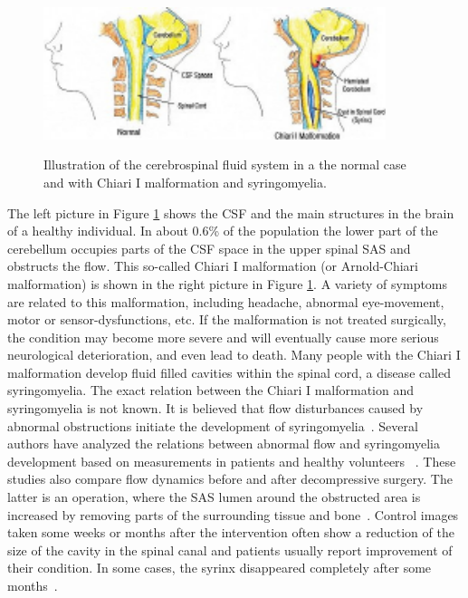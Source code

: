 \begin{figure}\begin{center}
\includegraphics[width=100mm]{chapters/hentschel/pdf/chiara_about.pdf}
\caption{Illustration of the cerebrospinal fluid system in a the normal case and with Chiari I malformation and syringomyelia.}
\label{fig:anatomy}
\end{center}\end{figure}

The left picture in Figure \ref{fig:anatomy} shows the CSF and the
main structures in the brain of a healthy individual. In about 0.6\%
of the population the lower part of the cerebellum occupies parts of
the CSF space in the upper spinal SAS and obstructs the flow. This
so-called Chiari I malformation  (or
Arnold-Chiari malformation) is
shown in the right picture in Figure \ref{fig:anatomy}. A variety of
symptoms are related to this malformation, including headache, abnormal
eye-movement, motor or sensor-dysfunctions, etc. If the malformation
is not treated surgically, the condition may become more severe and
will eventually cause more serious neurological deterioration, and even
lead to death. Many people with the Chiari I malformation develop
fluid filled cavities within the spinal cord,  a
disease called syringomyelia. The exact
relation between the Chiari I malformation and syringomyelia is
 not known. It is believed that flow disturbances caused by abnormal obstructions initiate the development of
syringomyelia~\cite{Oldfield1994}. Several authors have
analyzed the relations between abnormal flow and syringomyelia
development based on measurements in patients and healthy volunteers
~\cite{Heiss1999,Pinna2000,Hofmann2000,Haughton2003}. These studies also compare flow dynamics before and after decompressive
surgery. The latter is an operation, where the SAS lumen around the
obstructed area is increased by removing parts of the surrounding
tissue and bone~\cite{Milhorat2003}. Control
images taken some weeks or months after the intervention often show a
reduction of the size of the cavity in the spinal canal and patients
usually report improvement of their condition. In some cases, the
syrinx disappeared completely after some months~\cite{Oldfield1994,Pinna2000,Heiss1999}.

